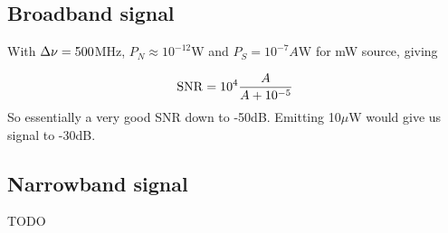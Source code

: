 \documentclass{article}
\begin{document}
\subsection*{Broadband signal}

With $\Delta \nu=500$MHz, $P_N\approx 10^{-12}$W and $P_S=10^{-7}A$W for mW
source, giving

\begin{equation}
  {\rm SNR} = 10^4 \frac{A}{A+10^{-5}}
\end{equation}
So essentially a very good SNR down to -50dB. Emitting 10$\mu$W would
give us signal to -30dB.


\subsection*{Narrowband signal}

TODO
\end{document}
